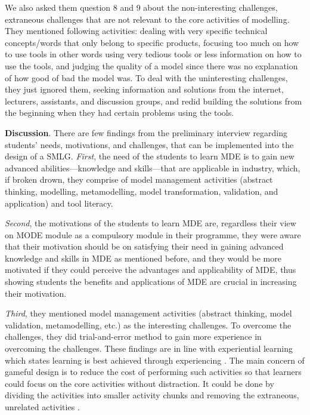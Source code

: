 \documentclass[12pt, a4paper]{report}
\begin{document}
We also asked them question 8 and 9 about the non-interesting challenges, extraneous challenges that are not relevant to the core activities of modelling. They mentioned following activities: dealing with very specific technical concepts/words that only belong to specific products, focusing too much on how to use tools in other words using very tedious tools or less information on how to use the tools, and judging the quality of a model since there was no explanation of how good of bad the model was. To deal with the uninteresting challenges, they just ignored them, seeking information and solutions from the internet, lecturers, assistants, and discussion groups, and redid building the solutions from the beginning when they had certain problems using the tools.

\textbf{Discussion}. There are few findings from the preliminary interview regarding students' needs, motivations, and challenges, that can be implemented into the design of a SMLG. \textit{First}, the need of the students to learn MDE is to gain new advanced abilities---knowledge and skills---that are applicable in industry, which, if broken drown, they comprise of model management activities (abstract thinking, modelling, metamodelling, model transformation, validation, and application) and tool literacy. 

\textit{Second}, the motivations of the students to learn MDE are, regardless their view on MODE module as a compulsory module in their programme, they were aware that their motivation should be on satisfying their need in gaining advanced knowledge and skills in MDE as mentioned before, and they would be more motivated if they could perceive the advantages and applicability of MDE, thus showing students the benefits and applications of MDE are crucial in increasing their motivation.

\textit{Third}, they mentioned model management activities (abstract thinking, model validation, metamodelling, etc.) as the interesting challenges. To overcome the challenges, they did trial-and-error method to gain more experience in overcoming the challenges. These findings are in line with experiential learning which states learning is best achieved through experiencing \cite{kolb2014experiential}. The main concern of gameful design is to reduce the cost of performing such activities so that learners could focus on the core activities without distraction. It could be done by dividing the activities into smaller activity chunks and removing the extraneous, unrelated activities \cite{deterding2015lens}. 
\end{document}
